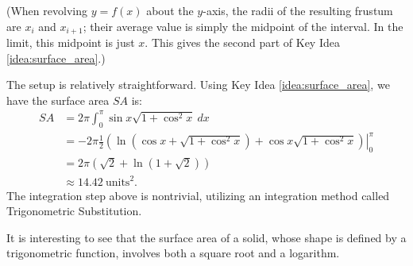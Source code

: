 (When revolving $y=f(x)$ about the $y$-axis, the radii of the resulting frustum are $x_i$ and $x_{i+1}$; their average value is simply the midpoint of the interval. In the limit, this midpoint is just $x$. This gives the second part of Key Idea \ref{idea:surface_area}.)\\

{The setup is relatively straightforward. Using Key Idea \ref{idea:surface_area}, we have the surface area $SA$ is:
\begin{align*}
SA  &=	2\pi\int_0^\pi \sin x\sqrt{1+\cos^2x}\ dx \\
		&=	-2\pi\frac12\left.\left(\ln\left(\cos x+\sqrt{1+\cos^2 x}\right)+\cos x\sqrt{1+\cos^2x}\right)\right|_0^\pi \\
		&= 2\pi\left(\sqrt{2}+\ln\left(1+\sqrt{2}\right)\right) \\
		&\approx 14.42\ \text{units}^2.
\end{align*}
The integration step above is nontrivial, utilizing an integration method called Trigonometric Substitution. 

It is interesting to see that the surface area of a solid, whose shape is defined by a trigonometric function, involves both a square root and a logarithm.
}\\

